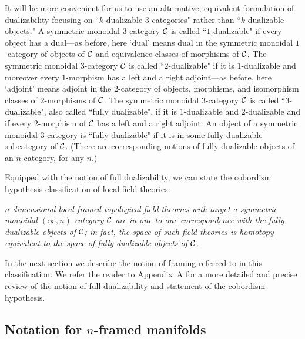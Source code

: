 \documentclass{amsart}
\begin{document}
It will be more convenient for us to use an alternative, equivalent formulation of dualizability focusing on ``$k$-dualizable $3$-categories" rather than ``$k$-dualizable objects."  A symmetric monoidal $3$-category $\mathcal C$ is called ``$1$-dualizable" if every object has a dual---as before, here `dual' means dual in the symmetric monoidal $1$-category of objects of $\mathcal C$ and equivalence classes of morphisms of $\mathcal C$.  The symmetric monoidal $3$-category $\mathcal C$ is called ``$2$-dualizable" if it is 1-dualizable and moreover every $1$-morphism has a left and a right adjoint---as before, here `adjoint' means adjoint in the $2$-category of objects, morphisms, and isomorphism classes of 2-morphisms of $\mathcal C$.  The symmetric monoidal $3$-category $\mathcal C$ is called ``$3$-dualizable", also called ``fully dualizable", if it is $1$-dualizable and $2$-dualizable and if every $2$-morphism of $\mathcal C$ has a left and a right adjoint.  An object of a symmetric monoidal $3$-category is ``fully dualizable" if it is in some fully dualizable subcategory of $\mathcal C$.  %
(There are corresponding notions of fully-dualizable objects of an $n$-category, for any $n$.)

Equipped with the notion of full dualizability, we can state the cobordism hypothesis classification of local field theories: \vspace{7pt}

\setlength{\leftskip}{.75cm}

 \emph{$n$-dimensional local framed topological field theories with target a symmetric monoidal $(\infty,n)$-category $\mathcal C$ are in one-to-one correspondence with the fully dualizable objects of $\mathcal C$; in fact, the space of such field theories is homotopy equivalent to the space of fully dualizable objects of $\mathcal C$.} \vspace{7pt}

\setlength{\leftskip}{0cm}

\nid In the next section we describe the notion of framing referred to in this classification.  We refer the reader to Appendix~A for a more detailed and precise review of the notion of full dualizability and statement of the cobordism hypothesis.  

\subsection{Notation for $n$-framed manifolds} 
\end{document}
